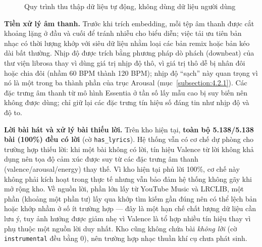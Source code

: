 \documentclass[../DoAn.tex]{subfiles}
\begin{document}
\begin{figure}[tbp]
\centering
{}
\caption{Quy trình thu thập dữ liệu tự động, không dùng dữ liệu người dùng}
\label{fig:collect}
\end{figure}

\textbf{Tiền xử lý âm thanh.} Trước khi trích embedding, mỗi tệp âm thanh được cắt khoảng lặng ở đầu và cuối để tránh nhiễu cho biểu diễn; việc tải ưu tiên bản nhạc có thời lượng khớp với siêu dữ liệu nhằm loại các bản remix hoặc bản kéo dài bất thường. Nhịp độ được trích bằng phương pháp dò phách (downbeat) của thư viện librosa thay vì dùng giá trị nhịp độ thô, vì giá trị thô dễ bị nhân đôi hoặc chia đôi (nhầm 60 BPM thành 120 BPM); nhịp độ ``sạch'' này quan trọng vì nó là một trong ba thành phần của trục Arousal (mục~\ref{subsection:4.2.1}). Các đặc trưng âm thanh từ mô hình Essentia ở tần số lấy mẫu cao bị suy biến nên không được dùng; chỉ giữ lại các đặc trưng tín hiệu số đáng tin như nhịp độ và độ to.

\textbf{Lời bài hát và xử lý bài thiếu lời.} Trên kho hiện tại, \textbf{toàn bộ 5.138/5.138 bài (100\%) đều có lời} (cờ \texttt{has\_lyrics}). Hệ thống vẫn có cơ chế dự phòng cho trường hợp thiếu lời: khi một bài không có lời, tín hiệu Valence từ lời không khả dụng nên tọa độ cảm xúc được suy từ các đặc trưng âm thanh (valence/\allowbreak arousal/\allowbreak energy) thay thế. Vì kho hiện tại phủ lời 100\%, cơ chế này không phải kích hoạt trong thực tế nhưng vẫn bảo đảm hệ thống không gãy khi mở rộng kho. Về nguồn lời, phần lớn lấy từ YouTube Music và LRCLIB, một phần (khoảng một phần tư) lấy qua khớp tìm kiếm gần đúng nên có thể lệch bản hoặc khớp nhầm ở số ít trường hợp --- đây là một hạn chế chất lượng dữ liệu cần lưu ý, tuy ảnh hưởng được giảm nhẹ vì Valence là tổ hợp nhiều tín hiệu thay vì phụ thuộc một nguồn lời duy nhất. Kho cũng không chứa bài \textit{không lời} (cờ \texttt{instrumental} đều bằng 0), nên trường hợp nhạc thuần khí cụ chưa phát sinh.
\end{document}
